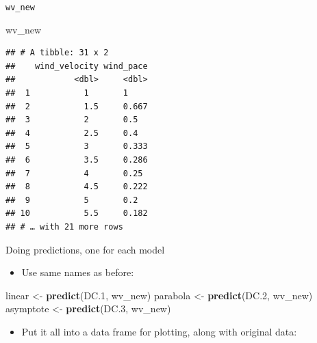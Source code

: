 \documentclass[
  ignorenonframetext,
]{beamer}
\newenvironment{Shaded}{\begin{snugshade}}{\end{snugshade}}
\newcommand{\DataTypeTok}[1]{\textcolor[rgb]{0.13,0.29,0.53}{#1}}
\newcommand{\FloatTok}[1]{\textcolor[rgb]{0.00,0.00,0.81}{#1}}
\newcommand{\KeywordTok}[1]{\textcolor[rgb]{0.13,0.29,0.53}{\textbf{#1}}}
\newcommand{\NormalTok}[1]{#1}
\newcommand{\OperatorTok}[1]{\textcolor[rgb]{0.81,0.36,0.00}{\textbf{#1}}}
\newcommand{\StringTok}[1]{\textcolor[rgb]{0.31,0.60,0.02}{#1}}
\providecommand{\tightlist}{%
  \setlength{\itemsep}{0pt}\setlength{\parskip}{0pt}}
\begin{document}
\begin{frame}[fragile]{\texttt{wv\_new}}
\protect\hypertarget{wv_new}{}

\begin{Shaded}
\begin{Highlighting}[]
\NormalTok{wv_new}
\end{Highlighting}
\end{Shaded}

\begin{verbatim}
## # A tibble: 31 x 2
##    wind_velocity wind_pace
##            <dbl>     <dbl>
##  1           1       1    
##  2           1.5     0.667
##  3           2       0.5  
##  4           2.5     0.4  
##  5           3       0.333
##  6           3.5     0.286
##  7           4       0.25 
##  8           4.5     0.222
##  9           5       0.2  
## 10           5.5     0.182
## # … with 21 more rows
\end{verbatim}

\end{frame}

\begin{frame}[fragile]{Doing predictions, one for each model}
\protect\hypertarget{doing-predictions-one-for-each-model}{}

\begin{itemize}
\tightlist
\item
  Use same names as before:
\end{itemize}

\begin{Shaded}
\begin{Highlighting}[]
\NormalTok{linear <-}\StringTok{ }\KeywordTok{predict}\NormalTok{(DC}\FloatTok{.1}\NormalTok{, wv_new)}
\NormalTok{parabola <-}\StringTok{ }\KeywordTok{predict}\NormalTok{(DC}\FloatTok{.2}\NormalTok{, wv_new)}
\NormalTok{asymptote <-}\StringTok{ }\KeywordTok{predict}\NormalTok{(DC}\FloatTok{.3}\NormalTok{, wv_new)}
\end{Highlighting}
\end{Shaded}

\begin{itemize}
\tightlist
\item
  Put it all into a data frame for plotting, along with original data:
\end{itemize}

\begin{Shaded}
\end{Shaded}

\end{frame}
\end{document}
